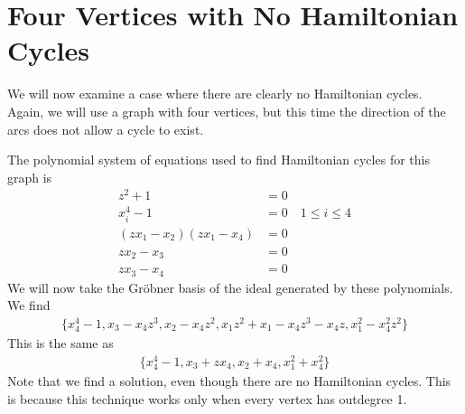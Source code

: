 \documentclass[letterpaper]{article}
\newcommand{\aln}[1]{\begin{align*} #1 \end{align*}} %
\begin{document}
\section{Four Vertices with No Hamiltonian Cycles}
We will now examine a case where there are clearly no Hamiltonian cycles. Again, we will use a graph with four vertices, but this time the direction of the arcs does not allow a cycle to exist.
\begin{center}
\end{center}
The polynomial system of equations used to find Hamiltonian cycles for this graph is
\aln{
  z^2 + 1 &= 0\\
  x_i^4 - 1 &= 0 \quad 1 \leq i \leq 4\\
  (z x_1 - x_2)(z x_1 - x_4) &= 0\\
  z x_2 - x_3 &= 0\\
  z x_3 - x_4 &= 0
}
We will now take the Gr\"obner basis of the ideal generated by these polynomials. We find
\aln{
  \{x_4^4-1, x_3-x_4z^3, x_2-x_4z^2, x_1z^2+x_1-x_4z^3-x_4z, x_1^2-x_4^2z^2\}
}
This is the same as
\aln{
  \{x_4^4-1, x_3+zx_4, x_2+x_4, x_1^2+x_4^2\}
}
Note that we find a solution, even though there are no Hamiltonian cycles. This is because this technique works only when every vertex has outdegree 1.

\newpage
\end{document}

